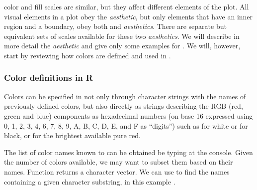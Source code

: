 \documentclass[krantz2]{krantz}\usepackage{knitr}
\begin{document}
color and fill scales are similar, but they affect different elements of the plot. All visual elements in a plot obey the  \emph{aesthetic}, but only elements that have an inner region and a boundary, obey both  and  \emph{aesthetics}. There are separate but equivalent sets of scales available for these two \emph{aesthetics}. We will describe in more detail the  \emph{aesthetic} and give only some examples for . We will, however, start by reviewing how colors are defined and used in \Rlang.

\subsubsection{Color definitions in R}\label{sec:plot:colors}
Colors can be specified in \Rlang not only through character strings with the names of previously defined colors, but also directly as strings describing the RGB (red, green and blue) components as hexadecimal numbers (on base 16 expressed using 0, 1, 2, 3, 4, 6, 7, 8, 9, A, B, C, D, E, and F as ``digits'') such as  for white or  for black, or  for the brightest available pure red.

The list of color names known to \Rlang can be obtained be typing  at the \Rlang console.
Given the number of colors available, we may want to subset them based on their names. Function  returns a character vector. We can use  to find the names containing a given character substring, in this example .
\end{document}
